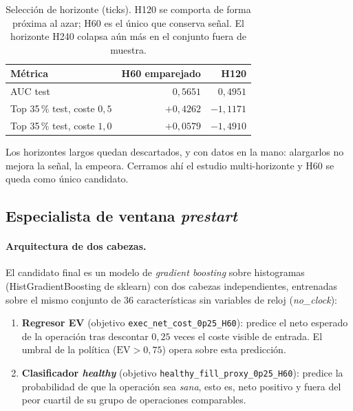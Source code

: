 \documentclass[11pt,a4paper]{article}
\begin{document}
\begin{table}[H]
\centering
\small
\begin{tabular}{lrr}
\toprule
\textbf{Métrica} & \textbf{H60 emparejado} & \textbf{H120} \\
\midrule
AUC test                       & $0{,}5651$ & $0{,}4951$ \\
Top 35\,\% test, coste $0{,}5$ & $+0{,}4262$ & $-1{,}1171$ \\
Top 35\,\% test, coste $1{,}0$ & $+0{,}0579$ & $-1{,}4910$ \\
\bottomrule
\end{tabular}
\caption{Selección de horizonte (ticks). H120 se comporta de forma próxima al
azar; H60 es el único que conserva señal. El horizonte H240 colapsa aún más en
el conjunto fuera de muestra.}
\label{tab:horizon}
\end{table}

Los horizontes largos quedan descartados, y con datos en la mano: alargarlos no
mejora la señal, la empeora. Cerramos ahí el estudio multi-horizonte y H60 se queda
como único candidato.

\subsection{Especialista de ventana \emph{prestart}}
\label{sec:specialist}

\paragraph{Arquitectura de dos cabezas.}
El candidato final es un modelo de \emph{gradient boosting} sobre histogramas
(HistGradientBoosting de sklearn) con dos cabezas independientes, entrenadas
sobre el mismo conjunto de 36 características sin variables de reloj
(\emph{no\_clock}):

\begin{enumerate}[noitemsep]
  \item \textbf{Regresor EV} (objetivo \texttt{exec\_net\_cost\_0p25\_H60}): predice
  el neto esperado de la operación tras descontar $0{,}25$ veces el coste visible de
  entrada. El umbral de la política ($\text{EV}>0{,}75$) opera sobre esta predicción.
  \item \textbf{Clasificador \emph{healthy}} (objetivo
  \texttt{healthy\_fill\_proxy\_0p25\_H60}): predice la probabilidad de que la
  operación sea \emph{sana}, esto es, neto positivo y fuera del peor cuartil de su
  grupo de operaciones comparables.
\end{enumerate}
\end{document}
